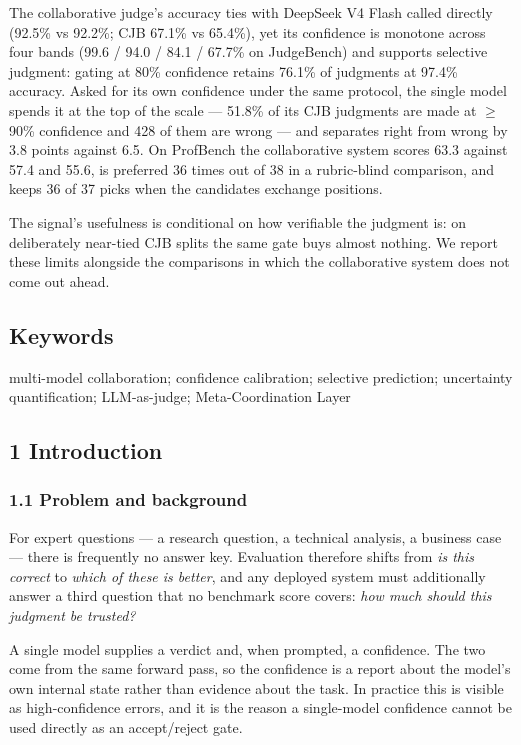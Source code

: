 \documentclass[
]{article}
\begin{document}
The collaborative judge's accuracy ties with DeepSeek V4 Flash called directly (92.5\% vs
92.2\%; CJB 67.1\% vs 65.4\%), yet its confidence is monotone across four bands (99.6 /
94.0 / 84.1 / 67.7\% on JudgeBench) and supports selective judgment: gating at 80\%
confidence retains 76.1\% of judgments at 97.4\% accuracy. Asked for its own confidence
under the same protocol, the single model spends it at the top of the scale --- 51.8\% of
its CJB judgments are made at $\geq$ 90\% confidence and 428 of them are wrong --- and
separates right from wrong by 3.8 points against 6.5. On ProfBench the collaborative
system scores 63.3 against 57.4 and 55.6, is preferred 36 times out of 38 in a rubric-blind
comparison, and keeps 36 of 37 picks when the candidates exchange positions.

The signal's usefulness is conditional on how verifiable the judgment is: on deliberately
near-tied CJB splits the same gate buys almost nothing. We report these limits alongside the
comparisons in which the collaborative system does not come out ahead.

\subsection{Keywords}\label{keywords}

multi-model collaboration; confidence calibration; selective prediction;
uncertainty quantification; LLM-as-judge; Meta-Coordination Layer

\subsection{1 Introduction}\label{introduction}

\subsubsection{1.1 Problem and background}\label{problem}

For expert questions --- a research question, a technical analysis, a business case ---
there is frequently no answer key. Evaluation therefore shifts from \emph{is this
correct} to \emph{which of these is better}, and any deployed system must additionally
answer a third question that no benchmark score covers: \emph{how much should this
judgment be trusted?}

A single model supplies a verdict and, when prompted, a confidence. The two come from
the same forward pass, so the confidence is a report about the model's own internal
state rather than evidence about the task. In practice this is visible as
high-confidence errors, and it is the reason a single-model confidence cannot be used
directly as an accept/reject gate.
\end{document}
